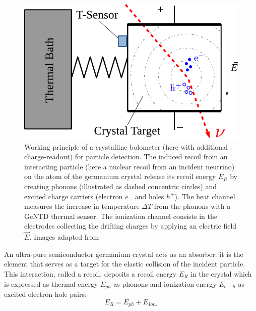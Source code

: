 \begin{figure}
\centering
\includegraphics[scale=1]{Figures/Experiment/crystalline_detector_principle.pdf}
\caption{Working principle of a crystalline bolometer (here with additional charge-readout) for particle detection. The induced recoil from an interacting particle (here a nuclear recoil from an incident neutrino) on the atom of the germanium crystal release its recoil energy $E_R$ by creating phonons (illustrated as dashed concentric circles) and excited charge carriers (electron $e^-$ and holes $h^+$). The heat channel measures the increase in temperature $\Delta T$ from the phonons with a GeNTD thermal sensor. The ionization channel consists in the electrodes collecting the drifting charges by applying an electric field $\vec{E}$.
 Images adapted from \cite{Schumann:2019eaa}}
\label{fig:detector-principle}
\end{figure}

An ultra-pure semiconductor germanium crystal acts as an absorber: it is the element that serves as a target for the elastic collision of the incident particle. This interaction, called a recoil, deposits a recoil energy $E_R$ in the crystal which is expressed as thermal energy $E_{ph}$ as phonons and ionization energy $E_{e-h}$ as excited electron-hole pairs:
\begin{equation}
\label{energy}
E_R = E_{ph} + E_{Ion.}
\end{equation}

